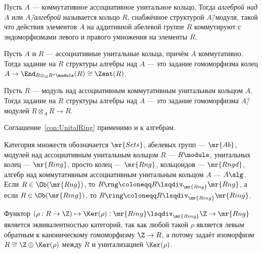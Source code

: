 \documentclass[
	extrafontsizes,
	11pt,
	hyphens,
]{memoir}
\begin{document}
\begin{definition}
Пусть \(A\) --- коммутативное ассоциативное унитальное кольцо.
Тогда \emph{алгеброй над \(A\)} или \emph{\(A\)\=/алгеброй} называется кольцо \(R\), снабжённое структурой \(A\)\=/модуля, такой что действия элементов \(A\) на аддитивной абелевой группе \(R\) коммутируют с эндоморфизмами левого и правого умножения на элементы \(R\).
\end{definition}

\begin{observation}
Пусть \(A\) и \(R\) --- ассоциативные унитальные кольца, причём \(A\) коммутативно.
Тогда задание на \(R\) структуры алгебры над \(A\) --- это задание гомоморфизма колец \(A \to \End_{R \otimes_{\Z} R^o\module}(R) \cong \Zent(R)\).
\end{observation}

\begin{observation}
Пусть \(R\) --- модуль над ассоциативным коммутативным унитальным кольцом \(A\).
Тогда задание на \(R\) структуры алгебры над \(A\) --- это задание гомоморфизма \(A\)\=/модулей \(R \otimes_A R \to R\).
\end{observation}

\begin{convention}
Соглашение~\ref{con:UnitalRing} применимо и к алгебрам.
\end{convention}

\begin{notation}
Категория множеств обозначается \(\mr{Sets}\),
абелевых групп --- \(\mr{Ab}\),
модулей над ассоциативным унитальным кольцом \(R\) --- \(R\module\),
унитальных колец --- \(\mr{Ring}\),
просто колец --- \(\mr{Rng}\),
кольцоидов --- \(\mr{Rngd}\),
алгебр над коммутативным ассоциативным унитальным кольцом \(A\) --- \(A\alg\).
Если \(R \in \Ob(\mr{Rng})\), то \(R\rng \coloneqq R \lsqdiv_{\mr{Rng}} \mr{Rng}\), а если \(R \in \Ob(\mr{Ring})\), то \(R\ring \coloneqq R \lsqdiv_{\mr{Ring}} \mr{Ring}\).
\end{notation}

\begin{observation}
Функтор \((\rho : R \to \Z) \mapsto \Ker(\rho) : \mr{Ring} \lsqdiv_{\mr{Ring}} \Z \to \mr{Rng}\) является эквивалентностью категорий, так как любой такой \(\rho\) является левым обратным к каноническому гомоморфизму \(\Z \to R\), а потому задаёт изоморфизм \(R \cong \Z \oplus \Ker(\rho)\) между \(R\) и унитализацией \(\Ker(\rho)\).
\end{observation}
\end{document}
